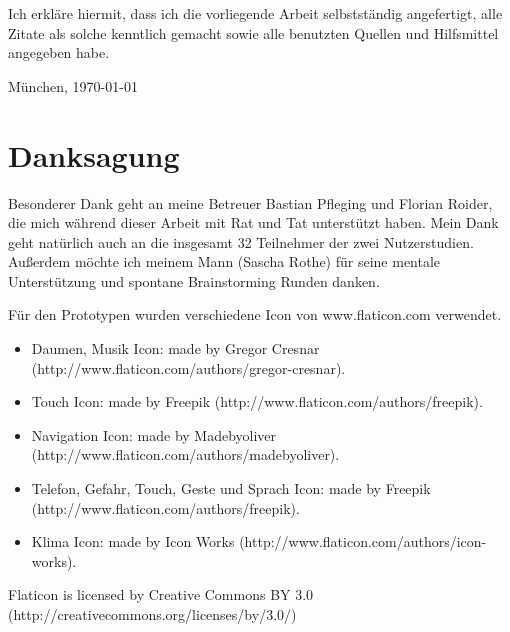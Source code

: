\documentclass[11pt,a4paper,twoside]{book}
\begin{document}
\vfill %

\noindent Ich erkläre hiermit, dass ich die vorliegende Arbeit
selbstständig angefertigt, alle Zitate als solche kenntlich gemacht
sowie alle benutzten Quellen und Hilfsmittel angegeben habe.

\bigskip\noindent München, \today

\vspace{4ex}\noindent\makebox[7cm]{\dotfill}

\cleardoublepage
\pagestyle{fancy}

\setlength{\parskip}{1pt}
\tableofcontents
\setlength{\parskip}{\baselineskip}


\cleardoublepage

\fancyhead[LE,RO]{\rightmark}
\fancyhead[LO,RE]{\leftmark}
\fancyfoot[LE,RO]{\thepage}















\chapter{Danksagung}\label{cha:Danksagung}

Besonderer Dank geht an meine Betreuer Bastian Pfleging und Florian Roider, die mich während dieser Arbeit mit Rat und Tat unterstützt haben. Mein Dank geht natürlich auch an die insgesamt 32 Teilnehmer der zwei Nutzerstudien. Außerdem möchte ich meinem Mann (Sascha Rothe) für seine mentale Unterstützung und spontane Brainstorming Runden danken. 

Für den Prototypen wurden verschiedene Icon von www.flaticon.com verwendet. 
\begin{itemize}
	\item Daumen, Musik Icon: made by Gregor Cresnar (http://www.flaticon.com/authors/gregor-cresnar).
	\item Touch Icon: made by Freepik (http://www.flaticon.com/authors/freepik).
	\item Navigation Icon: made by Madebyoliver (http://www.flaticon.com/authors/madebyoliver). 
	\item Telefon, Gefahr, Touch, Geste und Sprach Icon: made by Freepik (http://www.flaticon.com/authors/freepik). 
	\item Klima Icon: made by Icon Works (http://www.flaticon.com/authors/icon-works). 
\end{itemize}
Flaticon is licensed by Creative Commons BY 3.0 (http://creativecommons.org/licenses/by/3.0/)
\end{document}
